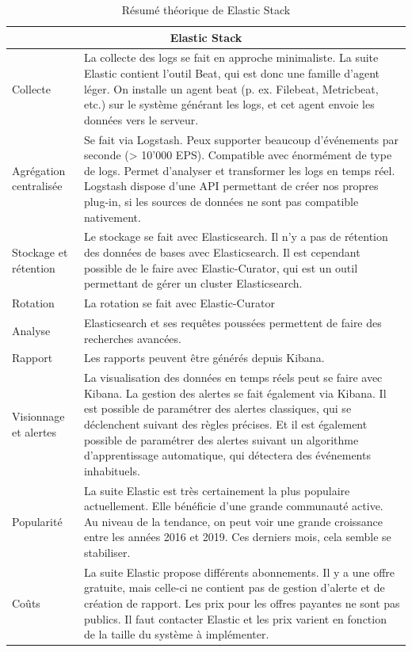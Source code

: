 \documentclass[paper=a4, fontsize=11pt]{scrartcl}
\begin{document}
\centering
\begin{table}[H]
\begin{tabular}{ |p{4cm}||p{12cm}|  }
    \hline
    \multicolumn{2}{|c|}{Elastic Stack} \\
    \hline
    Collecte & La collecte des logs se fait en approche minimaliste. La suite Elastic contient l'outil Beat, qui est donc une famille d'agent léger. On installe un agent beat (p. ex. Filebeat, Metricbeat, etc.) sur le système générant les logs, et cet agent envoie les données vers le serveur.\\
    \hline
    Agrégation centralisée & Se fait via Logstash. Peux supporter beaucoup d'événements par seconde (> 10'000 EPS). Compatible avec énormément de type de logs. Permet d'analyser et transformer les logs en temps réel. Logstash dispose d'une API permettant de créer nos propres plug-in, si les sources de données ne sont pas compatible nativement.\\
    \hline
    Stockage et rétention & Le stockage se fait avec Elasticsearch. Il n'y a pas de rétention des données de bases avec Elasticsearch. Il est cependant possible de le faire avec Elastic-Curator, qui est un outil permettant de gérer un cluster Elasticsearch.\\
    \hline
    Rotation & La rotation se fait avec Elastic-Curator\\
    \hline
    Analyse & Elasticsearch et ses requêtes poussées permettent de faire des recherches avancées.\\
    \hline
    Rapport & Les rapports peuvent être générés depuis Kibana.\\
    \hline
    Visionnage et alertes & La visualisation des données en temps réels peut se faire avec Kibana. La gestion des alertes se fait également via Kibana. Il est possible de paramétrer des alertes classiques, qui se déclenchent suivant des règles précises. Et il est également possible de paramétrer des alertes suivant un algorithme d'apprentissage automatique, qui détectera des événements inhabituels.\\
    \hline
    Popularité & La suite Elastic est très certainement la plus populaire actuellement. Elle bénéficie d'une grande communauté active. Au niveau de la tendance, on peut voir une grande croissance entre les années 2016 et 2019. Ces derniers mois, cela semble se stabiliser.\\
    \hline
    Coûts &  La suite Elastic propose différents abonnements. Il y a une offre gratuite, mais celle-ci ne contient pas de gestion d'alerte et de création de rapport. Les prix pour les offres payantes ne sont pas publics. Il faut contacter Elastic et les prix varient en fonction de la taille du système à implémenter.\\
    \hline
\end{tabular}
\caption{Résumé théorique de Elastic Stack}
\label{t-resumeELK}
\end{table}
\justify
\end{document}
